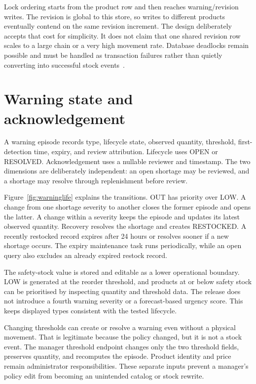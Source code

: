 Lock ordering starts from the product row and then reaches warning/revision writes. The revision is global to this store, so writes to different products eventually contend on the same revision increment. The design deliberately accepts that cost for simplicity. It does not claim that one shared revision row scales to a large chain or a very high movement rate. Database deadlocks remain possible and must be handled as transaction failures rather than quietly converting into successful stock events~\citep{mysql-deadlocks}.

\section{Warning state and acknowledgement}
A warning episode records type, lifecycle state, observed quantity, threshold, first-detection time, expiry, and review attribution. Lifecycle uses OPEN or RESOLVED. Acknowledgement uses a nullable reviewer and timestamp. The two dimensions are deliberately independent: an open shortage may be reviewed, and a shortage may resolve through replenishment before review.

Figure~\ref{fig:warninglife} explains the transitions. OUT has priority over LOW. A change from one shortage severity to another closes the former episode and opens the latter. A change within a severity keeps the episode and updates its latest observed quantity. Recovery resolves the shortage and creates RESTOCKED. A recently restocked record expires after 24 hours or resolves sooner if a new shortage occurs. The expiry maintenance task runs periodically, while an open query also excludes an already expired restock record.


The safety-stock value is stored and editable as a lower operational boundary. LOW is generated at the reorder threshold, and products at or below safety stock can be prioritised by inspecting quantity and threshold data. The release does not introduce a fourth warning severity or a forecast-based urgency score. This keeps displayed types consistent with the tested lifecycle.

Changing thresholds can create or resolve a warning even without a physical movement. That is legitimate because the policy changed, but it is not a stock event. The manager threshold endpoint changes only the two threshold fields, preserves quantity, and recomputes the episode. Product identity and price remain administrator responsibilities. These separate inputs prevent a manager's policy edit from becoming an unintended catalog or stock rewrite.

